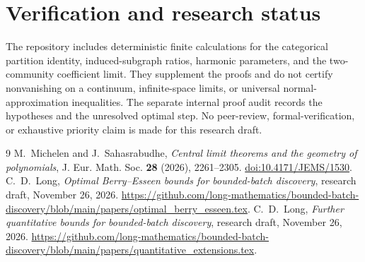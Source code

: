\documentclass[11pt]{article}
\numberwithin{equation}{section}
\theoremstyle{remark}\newtheorem{remark}[theorem]{Remark}
\begin{document}
\section*{Verification and research status}
The repository includes deterministic finite calculations for the
categorical partition identity, induced-subgraph ratios, harmonic
parameters, and the two-community coefficient limit. They supplement
the proofs and do not certify nonvanishing on a continuum, infinite-space
limits, or universal normal-approximation inequalities. The separate
internal proof audit records the hypotheses and the unresolved optimal
step. No peer-review, formal-verification, or exhaustive priority claim
is made for this research draft.

\begin{thebibliography}{9}
M.~Michelen and J.~Sahasrabudhe,
\emph{Central limit theorems and the geometry of polynomials},
J. Eur. Math. Soc. \textbf{28} (2026), 2261--2305.
\href{https://doi.org/10.4171/JEMS/1530}{doi:10.4171/JEMS/1530}.
C.~D.~Long, \emph{Optimal Berry--Esseen bounds for bounded-batch discovery},
research draft, November 26, 2026.
\url{https://github.com/long-mathematics/bounded-batch-discovery/blob/main/papers/optimal_berry_esseen.tex}.
C.~D.~Long, \emph{Further quantitative bounds for bounded-batch discovery},
research draft, November 26, 2026.
\url{https://github.com/long-mathematics/bounded-batch-discovery/blob/main/papers/quantitative_extensions.tex}.
\end{thebibliography}
\end{document}

